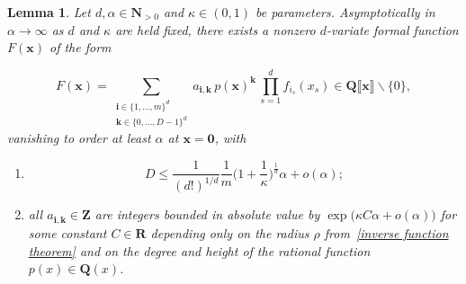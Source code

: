 \documentclass[10pt]{amsart}
\def\NwithoutzeroA{\mathbf{N}_{> 0}}
\renewcommand\setminus{\smallsetminus}
\def\Z{\mathbf{Z}}
\def\R{\mathbf{R}}
\def\Q{\mathbf{Q}}
\newtheorem{lemma}[subsubsection]{Lemma}
\theoremstyle{remark}
\numberwithin{equation}{subsection}
\def\numequation{\addtocounter{subsubsection}{1}\begin{equation}}
\begin{document}
\begin{lemma} \label{Siegel}
 Let $d, \alpha \in \NwithoutzeroA$ and $\kappa \in (0,1)$ be parameters.
Asymptotically
  in $\alpha \to \infty$ as $d$ and $\kappa$ are held fixed, there exists a \emph{nonzero} $d$-variate formal function $F(\mathbf{x})$ of the form
\numequation 
 \label{theform}  F(\mathbf{x}) =     \sum_{\substack{  \mathbf{i} \in \{1, \ldots, m\}^d   \\ \mathbf{k} \in \{0, \ldots, D-1\}^{d} }}  a_{\mathbf{i,k}}\, p( \mathbf{x})^{\mathbf{k}}  \, \prod_{s=1}^d f_{i_s}(x_s) 
\in \Q\llbracket \mathbf{x} \rrbracket \setminus \{0\},
\end{equation}
vanishing to order at least $\alpha$ at $\mathbf{x = 0}$,
   with
  \begin{enumerate}
    \item  \label{degrees} 
$$
  D \leq   \frac{1}{(d!)^{1/d}} \frac{1}{m} \Big( 1+\frac{1}{\kappa} \Big)^{\frac{1}{d}} \alpha + o(\alpha);
$$ 
     \item \label{heights} all $a_{\mathbf{i,k}} \in \Z$ are integers 
 bounded in absolute value by $\exp\big( \kappa C\alpha +   o(\alpha) \big)$
     for some constant $C \in \R$ depending only on %
the radius $\rho$ from~\eqref{inverse function theorem}     and on the degree and height of the rational function $p(x) \in \Q(x)$.
\end{enumerate}
\end{lemma}
\end{document}
